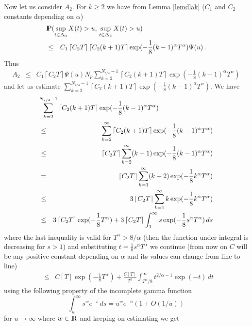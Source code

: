 Now let us consider $A_2$. For $k\geq 2$ we have from Lemma \ref{lemdlak} ($C_1$ and $C_2$ constants depending on $\alpha$)
\begin{eqnarray*}
\lefteqn{\Prob(\sup_{t\in \Delta_0} X(t)>u,\,\sup_{t\in \Delta_k} X(t)>u)}\\
&\leq& C_1 \left\lceil C_2 T\right\rceil \left\lceil C_2 (k+1)T\right\rceil \exp(-\frac{1}{8}(k-1)^\alpha T^\alpha)
\Psi(u)\,.
\end{eqnarray*}
Thus 
\begin{eqnarray*}
A_2&\leq & C_1 \left\lceil C_2 T\right\rceil\Psi(u)N_p\sum_{k=2}^{N_{\epsilon/4}-1}\left\lceil C_2 (k+1)T\right\rceil \exp(-\frac{1}{8}(k-1)^\alpha T^\alpha)
\end{eqnarray*}
and let us estimate $\sum_{k=2}^{N_{\epsilon/4}-1}\left\lceil C_2 (k+1)T\right\rceil \exp(-\frac{1}{8}(k-1)^\alpha T^\alpha)$. We have
\begin{eqnarray*}
\lefteqn{\sum_{k=2}^{N_{\epsilon/4}-1}\left\lceil C_2 (k+1)T\right\rceil \exp(-\frac{1}{8}(k-1)^\alpha T^\alpha)}\\
&\leq& \sum_{k=2}^{\infty}\left\lceil C_2 (k+1)T\right\rceil \exp(-\frac{1}{8}(k-1)^\alpha T^\alpha)\\
&\leq &\left\lceil C_2T\right\rceil\sum_{k=2}^{\infty}(k+1) \exp(-\frac{1}{8}(k-1)^\alpha T^\alpha)\\
&=&\left\lceil C_2T\right\rceil\sum_{k=1}^{\infty}(k+2) \exp(-\frac{1}{8}k^\alpha T^\alpha)\\
&\leq& 3\left\lceil C_2T\right\rceil\sum_{k=1}^{\infty}k\exp(-\frac{1}{8}k^\alpha T^\alpha)\\
&\leq& 3\left\lceil C_2T\right\rceil\exp(-\frac{1}{8} T^\alpha)+3\left\lceil C_2T\right\rceil\int_{1}^\infty s\exp(-\frac{1}{8}s^\alpha T^\alpha)\,ds
\end{eqnarray*}
where the last inequality is valid for $T^\alpha>8/\alpha$ (then the function under integral is decreasing for $s>1$) and
substituting $t=\frac{1}{8}s^\alpha T^\alpha$ we continue (from now on $C$ will be any positive constant depending on $\alpha$ and its values can change from line to line)
\begin{eqnarray*}
&\leq& C\left\lceil T\right\rceil\exp(-\frac{1}{8} T^\alpha)+\frac{C\left\lceil T\right\rceil}{T^2}\int_{T^\alpha/8}^\infty t^{2/\alpha-1}\exp(-t)\,dt
\end{eqnarray*}
using the following property of the incomplete gamma function
$$
\int_u^\infty s^w e^{-s}\,ds = u^w e^{-u}(1+O(1/u))
$$
for $u\rightarrow\infty$ where $w\in {\rm I\hspace{-0.8mm}R}$ and
keeping on estimating we get
